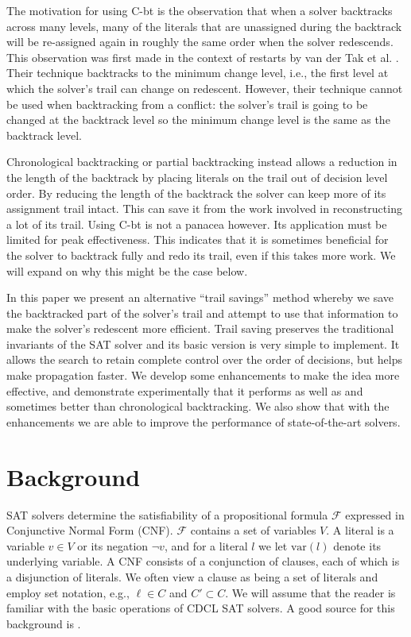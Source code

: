 \documentclass[runningheads]{llncs}
\newcommand{\sat}{SAT\xspace}
\newcommand{\var}{\text{var}}
\newcommand{\formula}{\ensuremath{\mathcal{F}}}
\newcommand{\cbt}{C-bt\xspace}
\begin{document}
The motivation for using \cbt is the observation that when a solver
backtracks across many levels, many of the literals that are
unassigned during the backtrack will be re-assigned again in roughly
the same order when the solver redescends. This observation was first
made in the context of restarts by van der Tak et
al. \cite{DBLP:journals/jsat/TakRH11}. Their technique backtracks to
the minimum change level, i.e., the first level at which the solver's
trail can change on redescent. However, their technique cannot be used
when backtracking from a conflict: the solver's trail is going to be
changed at the backtrack level so the minimum change level is the same
as the backtrack level. 

Chronological backtracking or partial backtracking instead allows a
reduction in the length of the backtrack by placing literals on the
trail out of decision level order. By reducing the length of the
backtrack the solver can keep more of its assignment trail
intact. This can save it from the work involved in reconstructing a
lot of its trail. Using \cbt is not a panacea however. Its application
must be limited for peak effectiveness. This indicates that it is
sometimes beneficial for the solver to backtrack fully and redo its
trail, even if this takes more work. We will expand on why this might
be the case below.

In this paper we present an alternative ``trail savings'' method whereby
we save the backtracked part of the solver's trail and attempt to
use that information to make the solver's redescent more
efficient. Trail saving preserves the traditional invariants of the
SAT solver and its basic version is very simple to implement. It
allows the search to retain complete control over the order of
decisions, but helps make propagation faster. We develop some
enhancements to make the idea more effective, and demonstrate
experimentally that it performs as well as and sometimes better than
chronological backtracking. We also show that with the enhancements we
are able to improve the performance of state-of-the-art solvers. 

\section{Background}
\label{sec:background}
\sat solvers determine the satisfiability of a propositional formula
$\formula$ expressed in Conjunctive Normal Form (CNF). $\formula$
contains a set of variables $V$. A literal is a variable $v\in V$ or
its negation $\lnot v$, and for a literal $l$ we let $\var(l)$ denote
its underlying variable. A CNF consists of a conjunction of clauses,
each of which is a disjunction of literals. We often view a clause as
being a set of literals and employ set notation, e.g., $\ell\in C$ and
$C'\subset C$. We will assume that the reader is familiar with the
basic operations of CDCL \sat solvers. A good source for this
background is \cite{DBLP:series/faia/SilvaLM09}.
\end{document}
